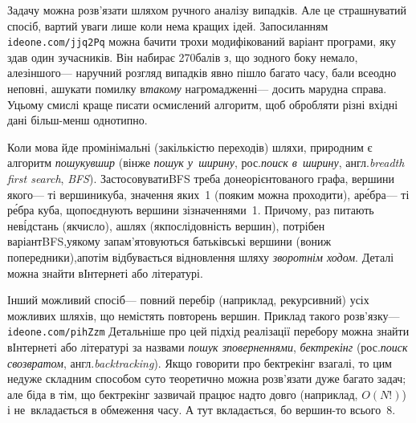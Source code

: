 \Tutorial	Задачу можна розв'язати шляхом ручного аналізу випадків. Але це страшнуватий спосіб, вартий уваги лише коли нема кращих ідей. За\nolinebreak[2] посиланням \verb"ideone.com/jjq2Pq" можна бачити трохи модифікований варіант програми, яку здав один з\nolinebreak[3] учасників. Він набирає 270\nolinebreak[3] балів з, що з\nolinebreak[3] одного боку немало, але\nolinebreak[2] з\nolinebreak[2] іншого\nolinebreak[3] --- на\nolinebreak[3] ручний розгляд випадків явно пішло багато часу, бали все\nolinebreak[2] одно не\nolinebreak[3] повні, а\nolinebreak[3] шукати помилку в\nolinebreak[3] \emph{такому} нагромадженні\nolinebreak[3] --- досить марудна справа. У\nolinebreak[3] цьому смислі краще писати осмислений алгоритм, щоб обробляти різні вхідні дані більш-менш однотипно.

{


Коли мова йде про\nolinebreak[3] мінімальні (за\nolinebreak[3] кількістю переходів) шляхи, природним є алгоритм \emph{пошуку\nolinebreak[3] вшир} (він\nolinebreak[3] же \emph{пошук у~ширину}, рос.\nolinebreak[3] \emph{поиск в~ширину}, англ.\nolinebreak[3] \emph{breadth first search}, \emph{BFS}). Застосовувати\nolinebreak[2] BFS треба до\nolinebreak[3] неорієн\-то\-ваного графа, вершини якого\nolinebreak[3] --- ті вершини\nolinebreak[1] куба, значення яких~1 (по\nolinebreak[3] яким можна проходити), а\nolinebreak[3] р\'{е}бра\nolinebreak[3] --- ті р\'{е}бра куба, що\nolinebreak[3] поєднують вершини зі\nolinebreak[3] значеннями~1. Причому, раз питають не\nolinebreak[3] в\'{і}д\-стань (як\nolinebreak[3] число), а\nolinebreak[3] шлях (як\nolinebreak[3] послідовність вершин), потрібен варіант\nolinebreak[2] BFS,\linebreak[1] у\nolinebreak[3] якому запам'ятовуються батьківські вершини (вони\nolinebreak[3] ж попередники),\linebreak[1] а\nolinebreak[3] потім відбувається відновлення шляху \emph{зворотнім ходом}. Деталі можна знайти в\nolinebreak[3] Інтернеті або літературі.

}

Інший можливий спосіб\nolinebreak[3] --- повний перебір (наприклад, рекурсивний) усіх можливих шляхів, що не\nolinebreak[3] містять повторень вершин. Приклад такого розв'язку\nolinebreak[3] --- \verb"ideone.com/pihZzm"\hspace{0.5em plus 1em} Детальніше про цей підхід реалізації перебору можна знайти в\nolinebreak[3] Інтернеті або літературі за назвами \emph{пошук з\nolinebreak[3] поверненнями}, \emph{бектрекінг} (рос.\nolinebreak[3] \emph{поиск с\nolinebreak[3] возвратом}, англ.\nolinebreak[3] \emph{backtracking}). Якщо говорити про бектрекінг взагалі, то цим не\nolinebreak[3] дуже складним способом суто теоретично можна розв'язати дуже багато задач; але біда в тім, що бектрекінг зазвичай працює надто довго (наприклад, $O(N!)$) і не~вкладається в обмеження часу. А тут вкладається, бо вершин-то всього~8.

